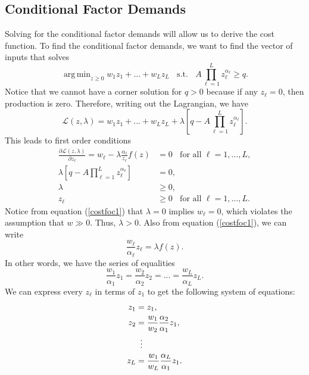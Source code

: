 \documentclass[12pt]{article}
\DeclareMathOperator*{\argmin}{arg\,min}
\theoremstyle{definition}
\begin{document}
\subsection{Conditional Factor Demands}
	Solving for the conditional factor demands will allow us to derive the cost function. To find the conditional factor demands, we want to find the vector of inputs that solves
	\[	\argmin_{z \geq 0} w_1z_1 + ... + w_{L}z_{L} \;\; \text{ s.t. } \;\; A \prod_{\ell = 1}^{L} z_{\ell}^{\alpha_{\ell}} \geq q.\]	
	Notice that we cannot have a corner solution for $q >0$ because if any $z_{\ell}=0$, then production is zero. Therefore, writing out the Lagrangian, we have
	\[	\mathcal{L}(z, \lambda) = 	w_1z_1 + ... + w_{L}z_{L}  + \lambda \left[q - A\prod_{\ell = 1}^{L} z_{\ell}^{\alpha_{\ell}} \right] . \]
	This leads to first order conditions
\begin{align}
	\frac{\partial \mathcal{L}(z, \lambda)}{\partial z_{\ell}} = w_{\ell} - \lambda \frac{\alpha_{\ell}}{z_{\ell}} f(z) &= 0  \;\; \text{ for all } {\ell}=1,...,L, \label{costfoc1}\\
	 \lambda \left[q - A\prod_{\ell = 1}^{L} z_{\ell}^{\alpha_{\ell}} \right] &=0, \label{costfoc2}\\
     \lambda &\geq 0,\\
     z_{\ell} &\geq 0 \;\; \text{ for all } \ell=1, ..., L.     
\end{align}	
Notice from equation (\ref{costfoc1}) that $\lambda=0$ implies $w_{\ell}=0$, which violates the assumption that $w \gg 0$. Thus, $\lambda > 0$. Also from equation (\ref{costfoc1}), we can write
	\[	  \frac{w_{\ell}}{\alpha_{\ell}}z_{\ell}  = \lambda f(z).	\]
In other words, we have the series of equalities
	\[ \frac{w_1}{\alpha_1}z_1 = \frac{w_2}{\alpha_2}z_2 = ... = \frac{w_L }{\alpha_L}z_L.	\]
We can express every $z_{\ell}$ in terms of $z_1$ to get the following system of equations:
\begin{align*}
	z_1 &= z_1,\\
	z_2 &= \frac{w_1}{w_2}\frac{\alpha_2}{\alpha_1} z_1,\\
	&\mathrel{\makebox[\widthof{=}]{\vdots}} \\
	z_L &= \frac{w_1}{w_L}\frac{\alpha_L}{\alpha_1} z_1.
\end{align*}
\end{document}
